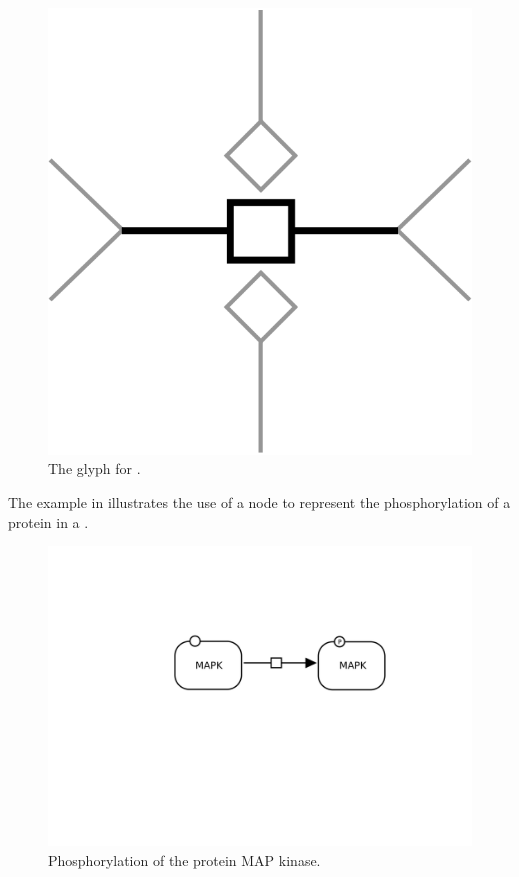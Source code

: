 \begin{figure}[H]
  \centering
  \includegraphics[scale = 0.4]{images/process}
  \caption{The \PD glyph for .}
  \label{fig:process}
\end{figure}


The example in  illustrates the use of a  node to represent the phosphorylation of a protein in a \PD.

\begin{figure}[H]
  \centering
  \includegraphics[scale = 0.3]{examples/process-phosphorylation}
  \caption{Phosphorylation of the protein MAP kinase.}
  \label{fig:trans-phos}
\end{figure}

